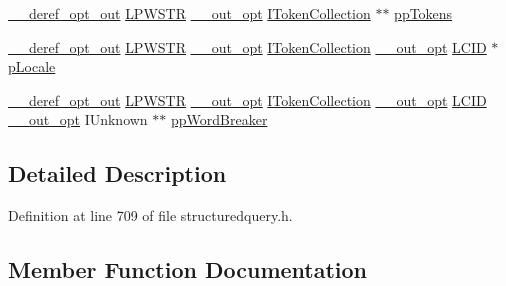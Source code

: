 \begin{DoxyCompactItemize}
\item 
\hyperlink{sal_8h_aca83a5a174d598aaeea78f024e4af103}{\+\_\+\+\_\+deref\+\_\+opt\+\_\+out} \hyperlink{mapinls_8h_acc28f72b93422cfd63a60e5a102a77b1}{L\+P\+W\+S\+TR} \hyperlink{sal_8h_a1ab4597e9d0c9bcc3f676c58b25019fe}{\+\_\+\+\_\+out\+\_\+opt} \hyperlink{structuredquery_8h_af02e566d558cb1e53b43313cb871ce87}{I\+Token\+Collection} $\ast$$\ast$ \hyperlink{struct_i_query_solution_vtbl_a2f12aeba14579ec5c0ffb1b4779c1858}{pp\+Tokens}
\item 
\hyperlink{sal_8h_aca83a5a174d598aaeea78f024e4af103}{\+\_\+\+\_\+deref\+\_\+opt\+\_\+out} \hyperlink{mapinls_8h_acc28f72b93422cfd63a60e5a102a77b1}{L\+P\+W\+S\+TR} \hyperlink{sal_8h_a1ab4597e9d0c9bcc3f676c58b25019fe}{\+\_\+\+\_\+out\+\_\+opt} \hyperlink{structuredquery_8h_af02e566d558cb1e53b43313cb871ce87}{I\+Token\+Collection} \hyperlink{sal_8h_a1ab4597e9d0c9bcc3f676c58b25019fe}{\+\_\+\+\_\+out\+\_\+opt} \hyperlink{mapinls_8h_aad243bba501745d51f6a670ade640986}{L\+C\+ID} $\ast$ \hyperlink{struct_i_query_solution_vtbl_ad5990b0902bfd2a012612544d0ff0774}{p\+Locale}
\item 
\hyperlink{sal_8h_aca83a5a174d598aaeea78f024e4af103}{\+\_\+\+\_\+deref\+\_\+opt\+\_\+out} \hyperlink{mapinls_8h_acc28f72b93422cfd63a60e5a102a77b1}{L\+P\+W\+S\+TR} \hyperlink{sal_8h_a1ab4597e9d0c9bcc3f676c58b25019fe}{\+\_\+\+\_\+out\+\_\+opt} \hyperlink{structuredquery_8h_af02e566d558cb1e53b43313cb871ce87}{I\+Token\+Collection} \hyperlink{sal_8h_a1ab4597e9d0c9bcc3f676c58b25019fe}{\+\_\+\+\_\+out\+\_\+opt} \hyperlink{mapinls_8h_aad243bba501745d51f6a670ade640986}{L\+C\+ID} \hyperlink{sal_8h_a1ab4597e9d0c9bcc3f676c58b25019fe}{\+\_\+\+\_\+out\+\_\+opt} I\+Unknown $\ast$$\ast$ \hyperlink{struct_i_query_solution_vtbl_a600831bab09aedb0edc24589fa8feb97}{pp\+Word\+Breaker}
\end{DoxyCompactItemize}


\subsection{Detailed Description}


Definition at line 709 of file structuredquery.\+h.



\subsection{Member Function Documentation}

